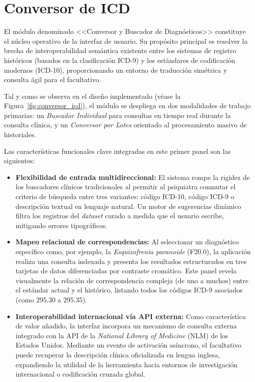 \documentclass[12pt,a4paper,onecolumn,oneside]{report}
\begin{document}
\section{Conversor de ICD}

El módulo denominado <<Conversor y Buscador de Diagnósticos>> constituye el núcleo operativo de la interfaz de usuario. Su propósito principal es resolver la brecha de interoperabilidad semántica existente entre los sistemas de registro históricos (basados en la clasificación ICD-9) y los estándares de codificación modernos (ICD-10), proporcionando un entorno de traducción simétrica y consulta ágil para el facultativo.

Tal y como se observa en el diseño implementado (véase la Figura~\ref{fig:conversor_icd}), el módulo se despliega en dos modalidades de trabajo primarias: un \textit{Buscador Individual} para consultas en tiempo real durante la consulta clínica, y un \textit{Conversor por Lotes} orientado al procesamiento masivo de historiales.

Las características funcionales clave integradas en este primer panel son las siguientes:

\begin{itemize}
    \item \textbf{Flexibilidad de entrada multidireccional:} El sistema rompe la rigidez de los buscadores clínicos tradicionales al permitir al psiquiatra conmutar el criterio de búsqueda entre tres variantes: código ICD-10, código ICD-9 o descripción textual en lenguaje natural. Un motor de sugerencias dinámico filtra los registros del \textit{dataset} curado a medida que el usuario escribe, mitigando errores tipográficos.
    
    \item \textbf{Mapeo relacional de correspondencias:} Al seleccionar un diagnóstico específico como, por ejemplo, la \textit{Esquizofrenia paranoide} (F20.0), la aplicación realiza una consulta indexada y presenta los resultados estructurados en tres tarjetas de datos diferenciadas por contraste cromático. Este panel revela visualmente la relación de correspondencia compleja (de uno a muchos) entre el estándar actual y el histórico, listando todos los códigos ICD-9 asociados (como 295.30 a 295.35).
    
    \item \textbf{Interoperabilidad internacional vía API externa:} Como característica de valor añadido, la interfaz incorpora un mecanismo de consulta externa integrado con la API de la \textit{National Library of Medicine} (NLM) \cite{clinicaltables_icd10cm} de los Estados Unidos. Mediante un evento de activación asíncrono, el facultativo puede recuperar la descripción clínica oficializada en lengua inglesa, expandiendo la utilidad de la herramienta hacia entornos de investigación internacional o codificación cruzada global.
\end{itemize}
\end{document}
